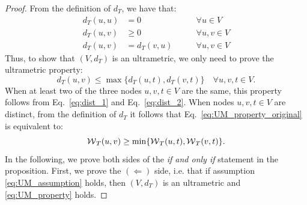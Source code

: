\begin{proof}

From the definition of $d_{T}$, we have that:
\begin{align}
d_{T}(u,u) &= 0 \qquad &\forall u\in V \label{eq:dist_1} \\ 
d_{T}(u,v) &\geq 0 \qquad &\forall u,v \in V \label{eq:dist_2}\\
d_{T}(u,v)& =d_{T}(v,u) \qquad &\forall u,v \in V \label{eq:dist_3}
\end{align}
Thus, to show that $(V, d_{T})$ is an ultrametric, we only need to prove the ultrametric property:
\begin{equation}\label{eq:UM_property_original}
d_T(u,v) \leq \max \{d_T(u,t), d_T(v,t)\} \quad \forall u,v,t \in V.
\end{equation}
When at least two of the three nodes $u,v,t \in V$ are the same, this property follows from Eq.~\ref{eq:dist_1} and Eq.~\ref{eq:dist_2}. When nodes $u,v,t\in V$ are distinct, from the definition of $d_{T}$ it follows that Eq.~\ref{eq:UM_property_original} is equivalent to:
\begin{equation}\label{eq:UM_property}
\mathcal{W}{}_{T}(u,v) \geq \min \{\mathcal{W}{}_{T}(u,t), \mathcal{W}{}_{T}(v,t)\}.
\end{equation}
In the following, we prove both sides of the \emph{if and only if} statement in the proposition. First, we prove the $(\Leftarrow)$ side, i.e. that if assumption \ref{eq:UM_assumption} holds, then $(V, d_{T})$ is an ultrametric and \ref{eq:UM_property} holds. 


\end{proof}

